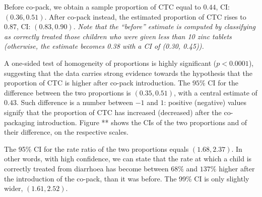 \documentclass[a4paper, 12pt]{article}
\begin{document}
Before co-pack, we obtain a sample proportion of  CTC equal to $0.44$, CI: $(0.36, 0.51)$. After co-pack instead, the estimated proportion of CTC rises to $0.87$, CI: $(0.83, 0.90)$.
{\it \small Note that the ``before'' estimate is computed by classifying as correctly treated those children who were given less than 10 zinc tablets (otherwise, the estimate becomes 0.38 with a CI of (0.30, 0.45)).}

A one-sided test of homogeneity of proportions is highly significant ($p<0.0001$), suggesting that the data carries strong evidence towards the hypothesis that the proportion of CTC is higher after co-pack introduction.
The $95\%$ CI for the difference between the two proportions is $(0.35, 0.51)$, with a central estimate of $0.43$. Such difference is a number between $-1$ and $1$: positive (negative) values signify that the proportion of CTC has increased (decreased) after the co-packaging introduction. Figure ** shows the CIs of the two proportions and of their difference, on the respective scales.

The 95\% CI for the rate ratio of the two proportions equals $(1.68, 2.37)$. 
In other words, with high confidence, we can state that
the rate at which a child is correctly treated from diarrhoea has become between $68\%$ and $137\%$ higher after the introduction of the co-pack, than it was before.
The 99\% CI is only slightly wider, $(1.61, 2.52)$. 





\newpage
 
  
\end{document}
